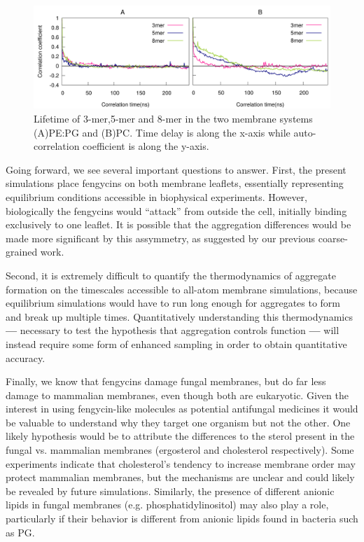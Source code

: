 \begin{figure}
\centering
\includegraphics[width=1.0\textwidth]{chapter2_figs/aggs_lipidtype.pdf}
\caption{\label{fig:ch2_membrane_lifetime} Lifetime of 3-mer,5-mer and 8-mer in the two membrane systems (A)PE:PG and (B)PC.
Time delay is along the x-axis while auto-correlation coefficient is along the y-axis.
}
\end{figure}

Going forward, we see several important questions to answer. First, the present
simulations place fengycins on both membrane leaflets, essentially representing
equilibrium conditions accessible in biophysical experiments. However, biologically the
fengycins would ``attack'' from outside the cell, initially binding exclusively to one
leaflet. It is possible that the aggregation differences would be made more
significant by this assymmetry, as suggested by our previous coarse-grained work.\cite{HornGrossfield2013}

Second, it is extremely difficult to quantify the thermodynamics of aggregate
formation on the timescales accessible to all-atom membrane simulations, because
equilibrium simulations would have to run long enough for aggregates to form and
break up multiple times. Quantitatively understanding this thermodynamics \textbf{---}
necessary to test the hypothesis that aggregation controls function \textbf{---} will instead
require some form of enhanced sampling in order to obtain quantitative accuracy.

Finally, we know that fengycins damage fungal membranes, but do far less damage to mammalian membranes, even though both are eukaryotic. Given the interest in using fengycin-like molecules as potential antifungal medicines it would be valuable to understand why they target one organism but not the other.\cite{Rinaldi2009} One likely hypothesis would be to attribute the differences to the sterol present in the fungal vs. mammalian membranes (ergosterol and cholesterol respectively). Some experiments indicate that cholesterol's tendency to increase membrane order may protect mammalian membranes, but the mechanisms are unclear and could likely be revealed by future simulations.\cite{Heerklotz2015}
Similarly, the presence of different anionic lipids in fungal membranes (e.g. phosphatidylinositol) may also play a role, particularly if their behavior is different from anionic lipids found in bacteria such as PG.
\newpage

